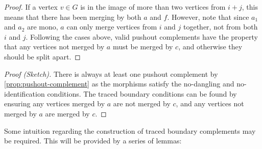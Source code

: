 {\begin{proof}
        If a vertex \(v \in G\) is in the image of more than two vertices from
        \(i + j\), this means that there has been merging by both \(a\) and
        \(f\).
        However, note that since \(a_1\) and \(a_2\) are mono, \(a\) can only
        merge vertices from \(i\) and \(j\) together, not from both \(i\) and
        \(j\).
        Following the cases above, valid pushout complements have the property
        that any vertices not merged by \(a\) must be merged by \(c\), and
        otherwise they should be split apart.
    \end{proof}
}{
    \begin{proof}[Proof (Sketch)]
        There is always at least one pushout complement by
        \cref{prop:pushout-complement} as the morphisms satisfy the no-dangling
        and no-identification conditions.
        The traced boundary conditions can be found by ensuring any
        vertices merged by \(a\) are not merged by \(c\), and any vertices
        not merged by \(a\) are merged by \(c\).
    \end{proof}
}

Some intuition regarding the construction of traced boundary complements may be
required.
This will be provided by a series of lemmas:

